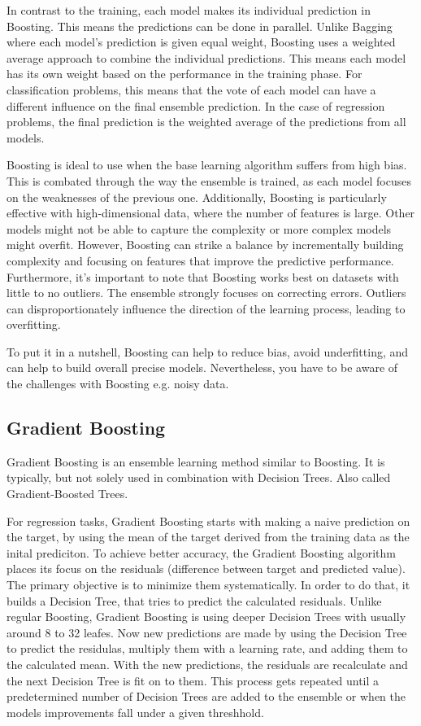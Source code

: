 In contrast to the training, each model makes its individual prediction in Boosting.
This means the predictions can be done in parallel.
Unlike Bagging where each model's prediction is given equal weight, Boosting uses
a weighted average approach to combine the individual predictions. This means
each model has its own weight based on the performance in the training phase.
For classification problems, this means that the vote of each model can have
a different influence on the final ensemble prediction.
In the case of regression problems, the final prediction is the weighted average
of the predictions from all models.

Boosting is ideal to use when the base learning algorithm suffers from high bias.
This is combated through the way the ensemble is trained, as each model focuses on the
weaknesses of the previous one.
Additionally, Boosting is particularly effective with high-dimensional data, where
the number of features is large. Other models might not be able to capture the 
complexity or more complex models might overfit.
However, Boosting can strike a balance by incrementally building complexity and 
focusing on features that improve the predictive performance.
Furthermore, it's important to note that Boosting works best on datasets with little 
to no outliers. The ensemble strongly focuses on correcting errors. Outliers can 
disproportionately influence the direction of the learning process, leading
to overfitting.


To put it in a nutshell, Boosting can help to reduce bias, avoid underfitting,
and can help to build overall precise models. Nevertheless, you have to be aware
of the challenges with Boosting e.g. noisy data.

\subsection{Gradient Boosting}
Gradient Boosting \citep{breiman1997arcing, friedman2001greedy, friedman2002stochastic} 
is an ensemble learning method similar to Boosting. It is typically, but not solely used in 
combination with Decision Trees. Also called Gradient-Boosted Trees.

For regression tasks, Gradient Boosting starts with making a naive prediction on the target,
by using the mean of the target derived from the training data as the inital prediciton.
To achieve better accuracy, the Gradient Boosting algorithm places its focus on the
residuals (difference between target and predicted value). The primary objective is to minimize
them systematically.
In order to do that, it builds a Decision Tree, that tries to predict the calculated residuals.
Unlike regular Boosting, Gradient Boosting is using deeper Decision Trees with usually around 8 to 32 leafes.
Now new predictions are made by using the Decision Tree to predict the residulas, multiply them
with a learning rate, and adding them to the calculated mean.
With the new predictions, the residuals are recalculate and the next Decision Tree is fit on to them. 
This process gets repeated until a predetermined number of Decision Trees are added to the ensemble
or when the models improvements fall under a given threshhold.

